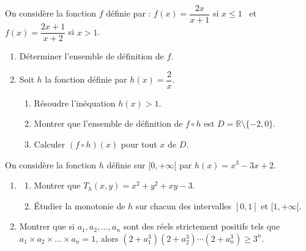 On considère la fonction $f$ définie par : $f(x)=\dfrac{2x}{x+1}$ si $x\leq1$ \ et \ $f(x)=\dfrac{2x+1}{x+2}$ si $x>1$.
\begin{enumerate}
\item Déterminer l'ensemble de définition de $f$.
\item Soit $h$ la fonction définie par $h(x)=\dfrac2x$.
\begin{enumerate}
\item Résoudre l'inéquation $h(x)>1$.
\item Montrer que l'ensemble de définition de $f\circ h$ est $D=\mathbb{R}\setminus\{-2,0\}$.
\item Calculer $(f\circ h)(x)$ pour tout $x$ de $D$.
\end{enumerate}
\end{enumerate}
\fin
{}
On considère la fonction $h$ définie sur $[0,+\infty[$ par $h(x)=x^3-3x+2$.
\begin{enumerate}
\item \begin{enumerate}
\item Montrer que $T_h(x,y)=x^2+y^2+xy-3$.
\item Étudier la monotonie de $h$ sur chacun des intervalles $[0,1]$ et $[1,+\infty[$.
\end{enumerate}
\item Montrer que si $a_1,a_2,\dots,a_n$ sont des réels strictement positifs tels que $a_1\times a_2\times\dots\times a_n=1$, alors $\left(2+a_1^3\right)\left(2+a_2^3\right)\cdots\left(2+a_n^3\right)\geq3^n$.
\end{enumerate}
\fin
